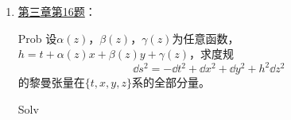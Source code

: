 \begin{xiti}
\begin{jie}
\begin{enumerate}
\begin{yl}{Solv}
\begin{enumerate}[leftmargin=2em]
\begin{align*}
	        	    \tensor{R}{_{(3)(0)(3)}^{(0)}} &= - \tensor{R}{_{(0)(3)(3)}^{(0)}} = - \frac{1}{4} z^{-\frac{3}{2}} \\ \displaybreak[1]
	        	    \tensor{R}{_{(3)(1)(1)}^{(3)}} &= - \tensor{R}{_{(1)(3)(1)}^{(3)}} = \frac{1}{8} z^{-\frac{3}{2}} \\
	        	    \tensor{R}{_{(3)(2)(3)}^{(2)}} &= - \tensor{R}{_{(2)(3)(3)}^{(2)}} = \frac{1}{8} z^{-\frac{3}{2}}
	        	    \end{align*}
	        	    \item[{\heiti 验证}] 根据
	        	    \begin{align*}
	        	    \tensor{\left(e^0\right)}{_a} &= \frac{1}{\sqrt[4]{z}} \tensor{\left(\dd{t}\right)}{_a} \\
	        	    \tensor{\left(e^1\right)}{_a} &= \sqrt{z} \tensor{\left(\dd{x}\right)}{_a} \\
	        	    \tensor{\left(e^2\right)}{_a} &= \sqrt{z} \tensor{\left(\dd{y}\right)}{_a} \\
	        	    \tensor{\left(e^3\right)}{_a} &= \frac{1}{\sqrt[4]{z}} \tensor{\left(\dd{z}\right)}{_a}
	        	    \end{align*}
	        	    和
	        	    \begin{align*}
	        	    \tensor{\left(e_0\right)}{^a} &= \sqrt[4]{z} \tensor{\left(\pdv{t}\right)}{^a} \\
	        	    \tensor{\left(e_1\right)}{^a} &= \frac{1}{\sqrt{z}} \tensor{\left(\pdv{x}\right)}{^a}\\
	        	    \tensor{\left(e_2\right)}{^a} &= \frac{1}{\sqrt{z}} \tensor{\left(\pdv{y}\right)}{^a} \\
	        	    \tensor{\left(e_3\right)}{^a} &= \sqrt[4]{z} \tensor{\left(\pdv{z}\right)}{^a}
	        	    \end{align*}
	        	    ……懒得验证了
	        	\end{enumerate}
	        \end{yl}
            \item \hyperlink{3.16}{第三章第16题}：
            \begin{yl}{Prob}
            	设$\alpha(z)$，$\beta(z)$，$\gamma(z)$为任意函数，$h=t+ \alpha(z)x+\beta(z)y+\gamma(z) $，求度规\[ \dd{s}^2= -\dd{t}^2 + \dd{x}^2 +\dd{y}^2 +h^2\dd{z}^2 \] 的黎曼张量在$\{t,x,y,z\}$系的全部分量。
            \end{yl}
            \begin{yl}{Solv}
            	\begin{enumerate}[leftmargin=2em]

\end{enumerate}
\end{yl}
\end{enumerate}
\end{jie}
\end{xiti}
